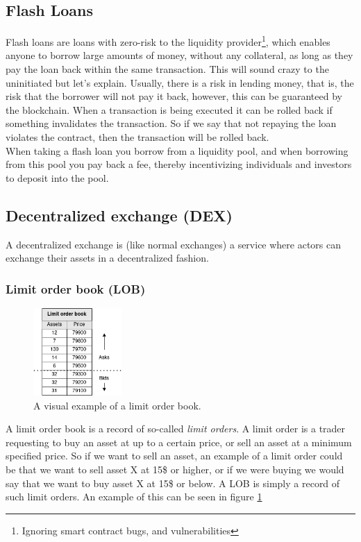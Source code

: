 \subsection{Flash Loans}
Flash loans are loans with zero-risk to the liquidity provider\footnote{Ignoring
smart contract bugs, and vulnerabilities}, which enables anyone to borrow large
amounts of money, without any collateral, as long as they pay the loan
back within the same transaction. This will sound crazy to the uninitiated but
let's explain. Usually, there is a risk in lending money, that is, the risk that
the borrower will not pay it back, however, this can be guaranteed by the
blockchain. When a transaction is being executed it can be rolled back if
something invalidates the transaction. So if we say that not repaying the loan
violates the contract, then the transaction will be rolled back.\\

When taking a flash loan you borrow from a liquidity pool, and when borrowing
from this pool you pay back a fee, thereby incentivizing individuals and
investors to deposit into the pool.

\subsection{Decentralized exchange (DEX)}
A decentralized exchange is (like normal exchanges) a service where actors can
exchange their assets in a decentralized fashion.

\subsubsection{Limit order book (LOB)}
\begin{figure}
  \centering
  \includegraphics[width=0.3\textwidth]{assests/Flash-loans-LOB}
  \caption{A visual example of a limit order book.}
  \label{fig:LOB}
\end{figure}
A limit order book is a record of so-called \textit{limit orders}. A limit order
is a trader requesting to buy an asset at up to a certain price, or sell an
asset at a minimum specified price. So if we want to sell an asset, an example of
a limit order could be that we want to sell asset X at 15\$ or higher, or if we
were buying we would say that we want to buy asset X at 15\$ or below. A LOB is
simply a record of such limit orders. An example of this can be seen in figure
\ref{fig:LOB}

